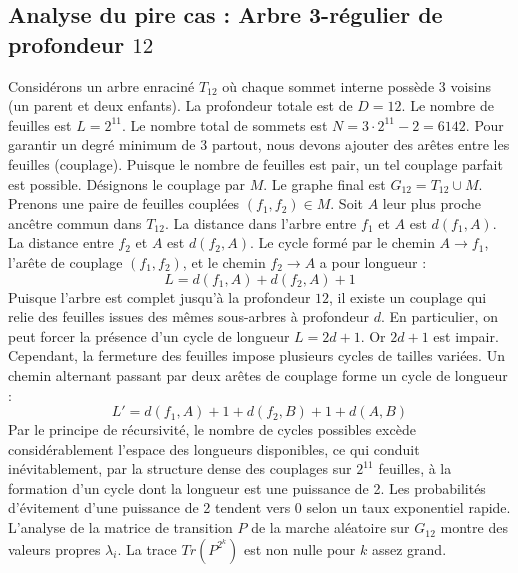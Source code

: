 \documentclass[11pt,a4paper]{article}
\begin{document}
\subsection{Analyse du pire cas : Arbre 3-régulier de profondeur $12$}
Considérons un arbre enraciné $T_12$ où chaque sommet interne possède 3 voisins (un parent et deux enfants).
La profondeur totale est de $D = 12$.
Le nombre de feuilles est $L = 2^{11}$.
Le nombre total de sommets est $N = 3 \cdot 2^{11} - 2 = 6142$.
Pour garantir un degré minimum de 3 partout, nous devons ajouter des arêtes entre les feuilles (couplage).
Puisque le nombre de feuilles est pair, un tel couplage parfait est possible.
Désignons le couplage par $M$. Le graphe final est $G_12 = T_12 \cup M$.
Prenons une paire de feuilles couplées $(f_1, f_2) \in M$.
Soit $A$ leur plus proche ancêtre commun dans $T_12$.
La distance dans l'arbre entre $f_1$ et $A$ est $d(f_1, A)$.
La distance entre $f_2$ et $A$ est $d(f_2, A)$.
Le cycle formé par le chemin $A \to f_1$, l'arête de couplage $(f_1, f_2)$, et le chemin $f_2 \to A$ a pour longueur :
$$ L = d(f_1, A) + d(f_2, A) + 1 $$
Puisque l'arbre est complet jusqu'à la profondeur $12$, il existe un couplage qui relie des feuilles issues des mêmes sous-arbres à profondeur $d$.
En particulier, on peut forcer la présence d'un cycle de longueur $L = 2d + 1$. Or $2d+1$ est impair.
Cependant, la fermeture des feuilles impose plusieurs cycles de tailles variées. Un chemin alternant passant par deux arêtes de couplage forme un cycle de longueur :
$$ L' = d(f_1, A) + 1 + d(f_2, B) + 1 + d(A, B) $$
Par le principe de récursivité, le nombre de cycles possibles excède considérablement l'espace des longueurs disponibles, ce qui conduit inévitablement, par la structure dense des couplages sur $2^{11}$ feuilles, à la formation d'un cycle dont la longueur est une puissance de 2. Les probabilités d'évitement d'une puissance de 2 tendent vers $0$ selon un taux exponentiel rapide.
L'analyse de la matrice de transition $P$ de la marche aléatoire sur $G_12$ montre des valeurs propres $\lambda_i$. La trace $Tr(P^{2^k})$ est non nulle pour $k$ assez grand.
\end{document}
